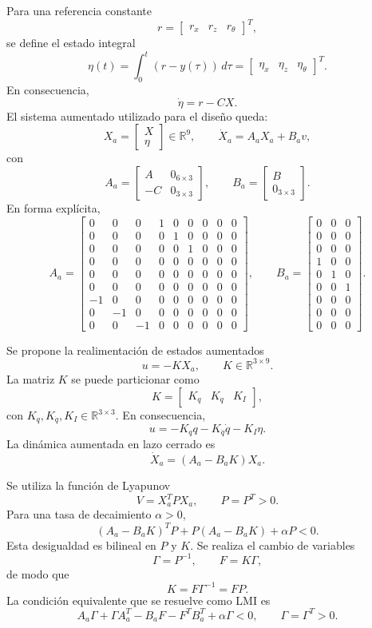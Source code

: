 Para una referencia constante
\[
  r=
  \begin{bmatrix}r_x&r_z&r_\theta\end{bmatrix}^{T},
\]
se define el estado integral
\[
  \eta(t)=\int_0^t(r-y(\tau))\,d\tau
  =
  \begin{bmatrix}\eta_x&\eta_z&\eta_\theta\end{bmatrix}^{T}.
\]
En consecuencia,
\[
  \dot\eta=r-CX.
\]
El sistema aumentado utilizado para el diseño queda:
\[
  X_a=
  \begin{bmatrix}X\\\eta\end{bmatrix}\in\mathbb{R}^{9},
  \qquad
  \dot X_a=A_aX_a+B_av,
\]
con
\[
  \boxed{
  A_a=
  \begin{bmatrix}
    A&0_{6\times3}\\
    -C&0_{3\times3}
  \end{bmatrix}},
  \qquad
  \boxed{
  B_a=
  \begin{bmatrix}B\\0_{3\times3}\end{bmatrix}}.
\]
En forma explícita,
\[
  A_a=
  \begin{bmatrix}
  0&0&0&1&0&0&0&0&0\\
  0&0&0&0&1&0&0&0&0\\
  0&0&0&0&0&1&0&0&0\\
  0&0&0&0&0&0&0&0&0\\
  0&0&0&0&0&0&0&0&0\\
  0&0&0&0&0&0&0&0&0\\
 -1&0&0&0&0&0&0&0&0\\
  0&-1&0&0&0&0&0&0&0\\
  0&0&-1&0&0&0&0&0&0
  \end{bmatrix},
  \qquad
  B_a=
  \begin{bmatrix}
  0&0&0\\
  0&0&0\\
  0&0&0\\
  1&0&0\\
  0&1&0\\
  0&0&1\\
  0&0&0\\
  0&0&0\\
  0&0&0
  \end{bmatrix}.
\]

Se propone la realimentación de estados aumentados
\[
  \boxed{u=-KX_a},
  \qquad K\in\mathbb{R}^{3\times9}.
\]
La matriz $K$ se puede particionar como
\[
  K=\begin{bmatrix}K_q&K_{\dot q}&K_I\end{bmatrix},
\]
con $K_q,K_{\dot q},K_I\in\mathbb{R}^{3\times3}$. En consecuencia,
\[
  u=-K_qq-K_{\dot q}\dot q-K_I\eta.
\]
La dinámica aumentada en lazo cerrado es
\[
  \dot X_a=(A_a-B_aK)X_a.
\]


Se utiliza la función de Lyapunov
\[
  V=X_a^TPX_a,\qquad P=P^T>0.
\]
Para una tasa de decaimiento $\alpha>0$,
\[
  (A_a-B_aK)^TP+P(A_a-B_aK)+\alpha P<0.
\]
Esta desigualdad es bilineal en $P$ y $K$. Se realiza el cambio de variables
\[
  \Gamma=P^{-1},\qquad F=K\Gamma,
\]
de modo que
\[
  K=F\Gamma^{-1}=FP.
\]
La condición equivalente que se resuelve como LMI es
\[
  \boxed{
  A_a\Gamma+\Gamma A_a^T
  -B_aF-F^TB_a^T+\alpha\Gamma<0,
  \qquad \Gamma=\Gamma^T>0.}
\]

